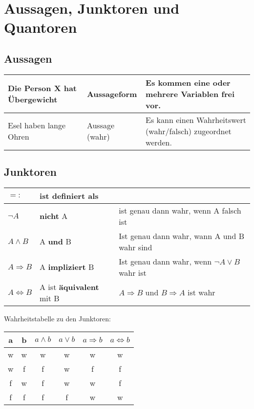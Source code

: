 \chapter{Aussagen, Junktoren und Quantoren}
\section{Aussagen}
\begin{longtable}{|p{}|p{}|p{}|}
	\hline
	Die Person X hat Übergewicht & Aussageform & Es kommen eine oder mehrere Variablen frei vor. \\
	\hline
	Esel haben lange Ohren & Aussage (wahr) & Es kann einen Wahrheitswert (wahr/falsch) zugeordnet werden. \\
	\hline
\end{longtable}

\section{Junktoren}
\begin{longtable}{|l|l|l|}
	\hline
	\(=:\) & ist definiert als & ~ \\
	\hline
	\(\neg A\) & \textbf{nicht} A & ist genau dann wahr, wenn A falsch ist \\
	\hline
	\( A \wedge B \) & A \textbf{und} B & Ist genau dann wahr, wann A und B wahr sind \\
	\hline
	\( A \Rightarrow B \) & A \textbf{impliziert} B & Ist genau dann wahr, wenn \(\neg A \vee B \) wahr ist \\
	\hline
	\( A \Leftrightarrow B \) & A ist \textbf{äquivalent} mit B & \(A \Rightarrow B \) und \(B \Rightarrow A \) ist wahr \\
	\hline
\end{longtable}
Wahrheitstabelle zu den Junktoren:
\begin{longtable}{|c|c||c|c|c|c|}
	\hline
	a & b & \(a \wedge b\) & \(a \vee b\) & \(a \Rightarrow b\) & \(a \Leftrightarrow b\) \\ \hline \hline
	w & w & w & w & w & w \\ \hline
	w & f & f & w & f & f \\ \hline
	f & w & f & w & w & f \\ \hline
	f & f & f & f & w & w \\ \hline
\end{longtable}

